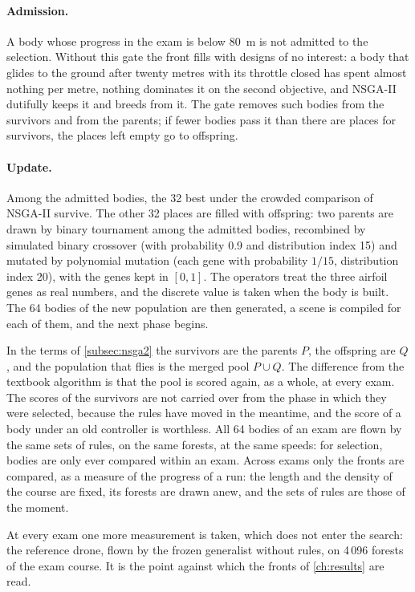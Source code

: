 \paragraph{Admission.} A body whose progress in the exam is below 80~m is not admitted to the selection. Without this gate the front fills with designs of no interest: a body that glides to the ground after twenty metres with its throttle closed has spent almost nothing per metre, nothing dominates it on the second objective, and NSGA-II dutifully keeps it and breeds from it. The gate removes such bodies from the survivors and from the parents; if fewer bodies pass it than there are places for survivors, the places left empty go to offspring.

\paragraph{Update.} Among the admitted bodies, the 32 best under the crowded comparison of NSGA-II survive. The other 32 places are filled with offspring: two parents are drawn by binary tournament among the admitted bodies, recombined by simulated binary crossover (with probability 0.9 and distribution index 15) and mutated by polynomial mutation (each gene with probability $1/15$, distribution index 20), with the genes kept in $[0, 1]$. The operators treat the three airfoil genes as real numbers, and the discrete value is taken when the body is built. The 64 bodies of the new population are then generated, a scene is compiled for each of them, and the next phase begins.

In the terms of \autoref{subsec:nsga2} the survivors are the parents $P$, the offspring are $Q$, and the population that flies is the merged pool $P \cup Q$. The difference from the textbook algorithm is that the pool is scored again, as a whole, at every exam. The scores of the survivors are not carried over from the phase in which they were selected, because the rules have moved in the meantime, and the score of a body under an old controller is worthless. All 64 bodies of an exam are flown by the same sets of rules, on the same forests, at the same speeds: for selection, bodies are only ever compared within an exam. Across exams only the fronts are compared, as a measure of the progress of a run: the length and the density of the course are fixed, its forests are drawn anew, and the sets of rules are those of the moment.

At every exam one more measurement is taken, which does not enter the search: the reference drone, flown by the frozen generalist without rules, on 4\,096 forests of the exam course. It is the point against which the fronts of \autoref{ch:results} are read.

